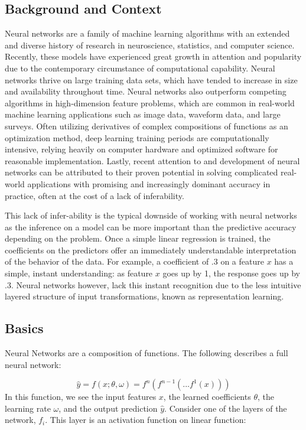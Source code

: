 \documentclass[12pt,twoside]{reedthesis}
\begin{document}
\subsection{Background and Context}\label{background-and-context}

Neural networks are a family of machine learning algorithms with an
extended and diverse history of research in neuroscience, statistics,
and computer science. Recently, these models have experienced great
growth in attention and popularity due to the contemporary circumstance
of computational capability. Neural networks thrive on large training
data sets, which have tended to increase in size and availability
throughout time. Neural networks also outperform competing algorithms in
high-dimension feature problems, which are common in real-world machine
learning applications such as image data, waveform data, and large
surveys. Often utilizing derivatives of complex compositions of
functions as an optimization method, deep learning training periods are
computationally intensive, relying heavily on computer hardware and
optimized software for reasonable implementation. Lastly, recent
attention to and development of neural networks can be attributed to
their proven potential in solving complicated real-world applications
with promising and increasingly dominant accuracy in practice, often at
the cost of a lack of inferability.

This lack of infer-ability is the typical downside of working with
neural networks as the inference on a model can be more important than
the predictive accuracy depending on the problem. Once a simple linear
regression is trained, the coefficients on the predictors offer an
immediately understandable interpretation of the behavior of the data.
For example, a coefficient of .3 on a feature \(x\) has a simple,
instant understanding: as feature \(x\) goes up by 1, the response goes
up by .3. Neural networks however, lack this instant recognition due to
the less intuitive layered structure of input transformations, known as
representation learning.

\subsection{Basics}\label{basics}

Neural Networks are a composition of functions. The following describes
a full neural network:

\[
\hat y = f(x; \theta, \omega) = f^n ( f^{n-1}  ( ... f^1(x)))
\] In this function, we see the input features \(x\), the learned
coefficients \(\theta\), the learning rate \(\omega\), and the output
prediction \(\hat{y}\). Consider one of the layers of the network,
\(f_i\). This layer is an activation function on linear function:
\end{document}
